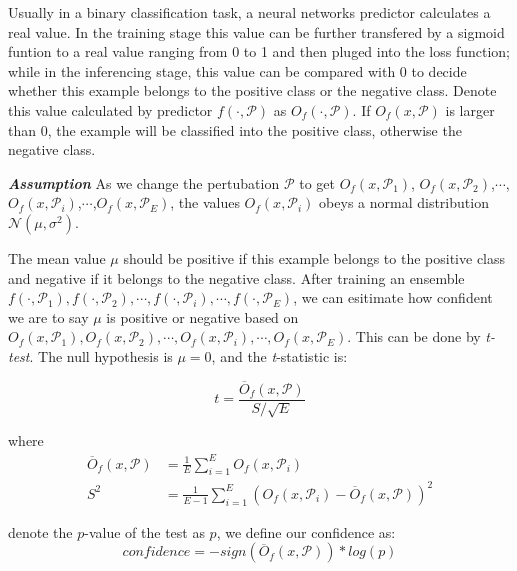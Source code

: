 \documentclass{article}
\begin{document}
Usually in a binary classification task, a neural networks predictor calculates a real value. In the training stage this value can be further transfered by a sigmoid funtion to a real value ranging from 0 to 1 and then pluged into the loss function; while in the inferencing stage, this value can be compared with 0 to decide whether this example belongs to the positive class or the negative class. Denote this value calculated by predictor $f \left(\cdot , \mathcal{P}\right)$ as $O_f \left(\cdot , \mathcal{P}\right)$. If $O_f \left(x , \mathcal{P}\right)$ is larger than 0, the example will be classified into the positive class, otherwise the negative class.

\textit{\textbf{Assumption}} As we change the pertubation $\mathcal{P}$ to get $O_f \left(x , \mathcal{P}_1\right)$, $O_f \left(x , \mathcal{P}_2\right)$,$\cdots$, $O_f \left(x , \mathcal{P}_i\right)$,$\cdots$,$O_f \left(x , \mathcal{P}_E\right) $, the values $O_f \left(x , \mathcal{P}_i\right)$ obeys a normal distribution $\mathcal{N}(\mu,{\sigma}^2)$. 

The mean value $\mu$ should be positive if this example belongs to the positive class and negative if it belongs to the negative class. After training an ensemble $f \left(\cdot , \mathcal{P}_1\right), f \left(\cdot , \mathcal{P}_2\right),\cdots, f \left(\cdot , \mathcal{P}_i\right),\cdots,f \left(\cdot , \mathcal{P}_E\right) $, we can esitimate how confident we are to say $\mu$ is positive or negative based on $O_f \left(x , \mathcal{P}_1\right), O_f \left(x , \mathcal{P}_2\right),\cdots, O_f \left(x , \mathcal{P}_i\right),\cdots,O_f \left(x , \mathcal{P}_E\right) $. This can be done by \textit{t-test}. The null hypothesis is $\mu = 0$, and the \textit{t}-statistic is: 

\begin{equation}
    t = \frac{\overline{O}_f\left(x , \mathcal{P}\right)}{S/\sqrt{E}}
\end{equation}

where
    \begin{eqnarray}
            \overline{O}_f\left(x , \mathcal{P}\right) &= \frac{1}{E} \sum_{i=1}^E O_f\left(x , \mathcal{P}_i\right) \\
            S^2 &= \frac{1}{E-1} \sum_{i=1}^E {(O_f\left(x , \mathcal{P}_i\right) - \overline{O}_f\left(x , \mathcal{P}\right))}^2
    \end{eqnarray}

denote the $\textit{p}$-value of the test as $\textit{p}$, we define our confidence as:
\begin{equation}
    confidence = -sign( \overline{O}_f\left(x , \mathcal{P}\right))*log(\textit{p})
\end{equation}
\end{document}
